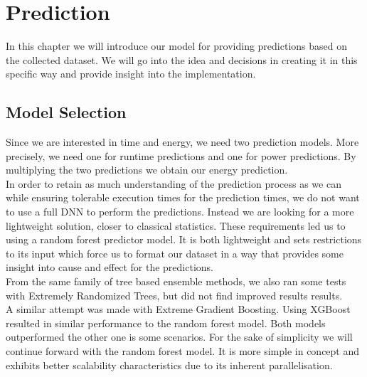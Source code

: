 \chapter{Prediction}\label{chap:contrib2}

In this chapter we will introduce our model for providing predictions based on the collected dataset. We will go into the idea and decisions in creating it in this specific way and provide insight into the implementation.


\section{Model Selection}
Since we are interested in time and energy, we need two prediction models. More precisely, we need one for runtime predictions and one for power predictions. By multiplying the two predictions we obtain our energy prediction. \\
In order to retain as much understanding of the prediction process as we can while ensuring tolerable execution times for the prediction times, we do not want to use a full DNN to perform the predictions. Instead we are looking for a more lightweight solution, closer to classical statistics. These requirements led us to using a random forest predictor model. It is both lightweight and sets restrictions to its input which force us to format our dataset in a way that provides some insight into cause and effect for the predictions. \\
From the same family of tree based ensemble methods, we also ran some tests with Extremely Randomized Trees, but did not find improved results results. \\
A similar attempt was made with Extreme Gradient Boosting. Using XGBoost resulted in similar performance to the random forest model. Both models outperformed the other one is some scenarios. For the sake of simplicity we will continue forward with the random forest model. It is more simple in concept and exhibits better scalability characteristics due to its inherent parallelisation.









